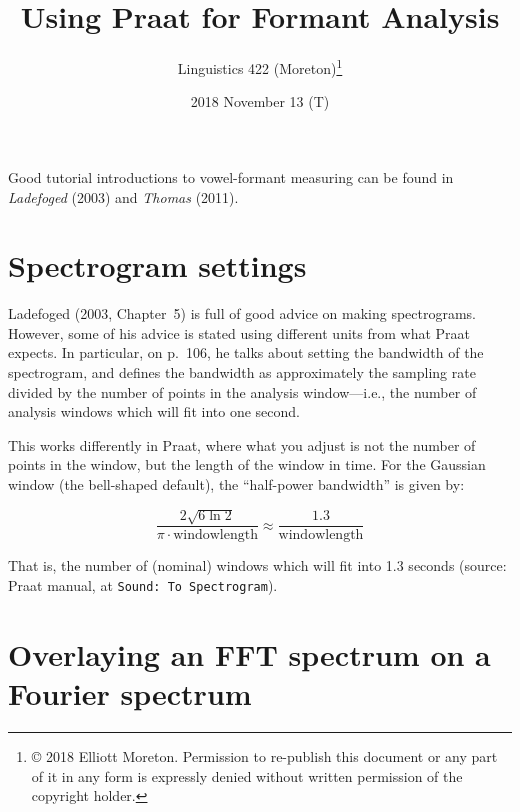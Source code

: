 \documentclass[12pt]{article}
\title{\vspace{-1cm}Using Praat for Formant Analysis}
\author{Linguistics 422 (Moreton)\thanks{© 2018 Elliott Moreton. Permission to re-publish this document or any part of it in any form is expressly denied without written permission of the copyright holder.}}
\date{2018 November 13 (T)}
\begin{document}
\maketitle

Good tutorial introductions to vowel-formant measuring can be found in \textit{Ladefoged} (2003) and \textit{Thomas} (2011).

\section{Spectrogram settings}

Ladefoged (2003, Chapter~5) is full of good advice on making spectrograms. However, some of his advice is stated using different units from what Praat expects. In particular, on p.~106, he talks about setting the bandwidth of the spectrogram, and defines the bandwidth as approximately the sampling rate divided by the number of points in the analysis window—i.e., the number of analysis windows which will fit into one second. 

This works differently in Praat, where what you adjust is not the number of points in the window, but the length of the window in time. For the Gaussian window (the bell-shaped default), the “half-power bandwidth” is given by:

\[
\frac{2\sqrt{6 \ln 2}}{\pi \cdot \text{windowlength}} \approx \frac{1.3}{\text{windowlength}}
\]

That is, the number of (nominal) windows which will fit into 1.3 seconds (source: Praat manual, at \texttt{Sound: To Spectrogram}).

\section{Overlaying an FFT spectrum on a Fourier spectrum}
\end{document}
